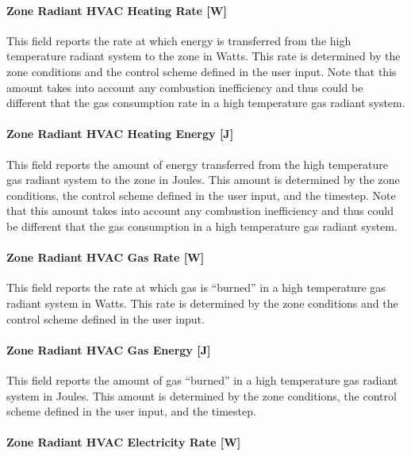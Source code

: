 \paragraph{Zone Radiant HVAC Heating Rate {[}W{]}}\label{zone-radiant-hvac-heating-rate-w-3}

This field reports the rate at which energy is transferred from the high temperature radiant system to the zone in Watts. This rate is determined by the zone conditions and the control scheme defined in the user input. Note that this amount takes into account any combustion inefficiency and thus could be different that the gas consumption rate in a high temperature gas radiant system.

\paragraph{Zone Radiant HVAC Heating Energy {[}J{]}}\label{zone-radiant-hvac-heating-energy-j-3}

This field reports the amount of energy transferred from the high temperature gas radiant system to the zone in Joules. This amount is determined by the zone conditions, the control scheme defined in the user input, and the timestep. Note that this amount takes into account any combustion inefficiency and thus could be different that the gas consumption in a high temperature gas radiant system.

\paragraph{Zone Radiant HVAC Gas Rate {[}W{]}}\label{zone-radiant-hvac-gas-rate-w}

This field reports the rate at which gas is ``burned'' in a high temperature gas radiant system in Watts. This rate is determined by the zone conditions and the control scheme defined in the user input.

\paragraph{Zone Radiant HVAC Gas Energy {[}J{]}}\label{zone-radiant-hvac-gas-energy-j}

This field reports the amount of gas ``burned'' in a high temperature gas radiant system in Joules. This amount is determined by the zone conditions, the control scheme defined in the user input, and the timestep.

\paragraph{Zone Radiant HVAC Electricity Rate {[}W{]}}\label{zone-radiant-hvac-electric-powerw}

